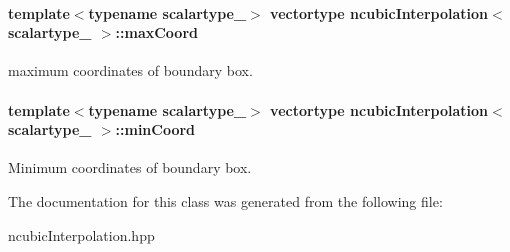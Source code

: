 \paragraph[{max\+Coord}]{\setlength{\rightskip}{0pt plus 5cm}template$<$typename scalartype\+\_\+$>$ vectortype {\bf ncubic\+Interpolation}$<$ scalartype\+\_\+ $>$\+::max\+Coord\hspace{0.3cm}{\ttfamily [protected]}}\label{classncubicInterpolation_a3bd706effb987f94c92f4c89605c7e7c}
maximum coordinates of boundary box. \hypertarget{classncubicInterpolation_a5360669149e2182a478f74941c4fb008}{}
\paragraph[{min\+Coord}]{\setlength{\rightskip}{0pt plus 5cm}template$<$typename scalartype\+\_\+$>$ vectortype {\bf ncubic\+Interpolation}$<$ scalartype\+\_\+ $>$\+::min\+Coord\hspace{0.3cm}{\ttfamily [protected]}}\label{classncubicInterpolation_a5360669149e2182a478f74941c4fb008}
Minimum coordinates of boundary box. 

The documentation for this class was generated from the following file\+:\begin{DoxyCompactItemize}
\item 
ncubic\+Interpolation.\+hpp\end{DoxyCompactItemize}
